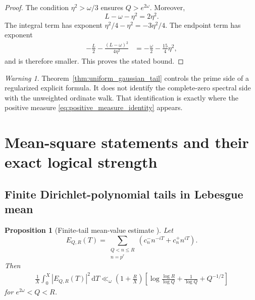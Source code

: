 \documentclass[11pt]{amsart}
\numberwithin{equation}{section}
\theoremstyle{plain}
\newtheorem{proposition}[theorem]{Proposition}
\theoremstyle{definition}
\theoremstyle{remark}
\newtheorem{warning}[theorem]{Warning}
\newcommand{\1}{\mathbf{1}}
\newcommand{\dd}{\,\mathrm{d}}
\begin{document}
\begin{proof}
The condition \(\eta^2>\omega/3\) ensures \(Q>e^{2\omega}\).  Moreover,
\begin{equation}
L-\omega-\eta^2=2\eta^2.
\label{eq:joint_choice_r}
\end{equation}
The integral term has exponent
\(\eta^2/4-\eta^2=-3\eta^2/4\).  The endpoint term has exponent
\begin{align}
-\frac L2-\frac{(L-\omega)^2}{4\eta^2}
&=
-\frac\omega2-\frac{15}{4}\eta^2,
\label{eq:joint_choice_endpoint_exponent}
\end{align}
and is therefore smaller.  This proves the stated bound.
\end{proof}

\begin{warning}
\label{warn:regularized_tail_not_ordinate_formula}
Theorem~\ref{thm:uniform_gaussian_tail} controls the prime side of a
regularized explicit formula.  It does not identify the complete-zero
spectral side with the unweighted ordinate walk.  That identification is
exactly where the positive measure \eqref{eq:positive_measure_identity}
appears.
\end{warning}

\section{Mean-square statements and their exact logical strength}
\label{sec:mean_square_logic}

\subsection{Finite Dirichlet-polynomial tails in Lebesgue mean}
\label{subsec:finite_dirichlet_mean}


\begin{proposition}[Finite-tail mean-value estimate {}]
\label{prop:finite_tail_mean_value}
Let
\begin{equation}
E_{Q,R}(T)
=
\sum_{\substack{Q<n\leq R\\n=p^r}}
\left(c_n^-n^{-iT}+c_n^+n^{iT}\right).
\label{eq:finite_tail_ER}
\end{equation}
Then
\begin{align}
\frac1X\int_0^X|E_{Q,R}(T)|^2\dd T
\ll_\omega
\left(1+\frac RX\right)
\left[
\log\frac{\log R}{\log Q}
+
\frac1{\log Q}
+
Q^{-1/2}
\right]
\label{eq:finite_tail_mean_value}
\end{align}
for $e^{2\omega}<Q<R$.
\end{proposition}
\end{document}
